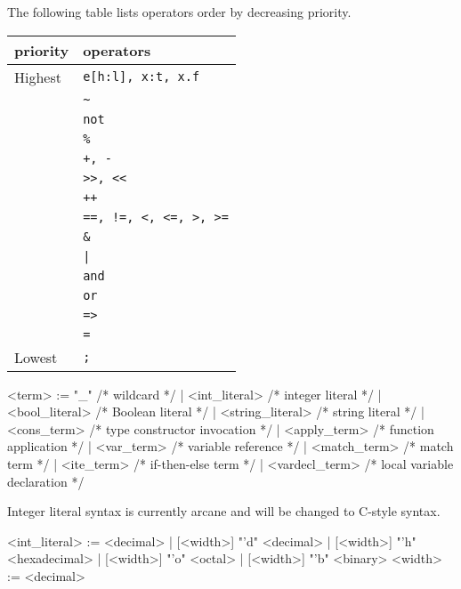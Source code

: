 \documentclass{report}
\newcommand{\src}[1]{\texttt{#1}}
\begin{document}
The following table lists operators order by decreasing priority.

\begin{tabular}{|l|l|}
    \hline
    \textbf{priority} & \textbf{operators} \\
    \hline\hline
    Highest & \src{e[h:l], x:t, x.f} \\
            & \src{\~} \\
            & \src{not} \\
            & \src{\%} \\
            & \src{+, -} \\
            & \src{>>, <<} \\
            & \src{++} \\
            & \src{==, !=, <, <=, >, >=} \\
            & \src{\&} \\
            & \src{|} \\
            & \src{and} \\
            & \src{or} \\
            & \src{=>} \\
            & \src{=} \\
    Lowest  & \src{;} \\
    \hline
\end{tabular}

\begin{bnflisting}{}
<term> := "_"                 /* wildcard */
        | <int_literal>       /* integer literal */
        | <bool_literal>      /* Boolean literal */
        | <string_literal>    /* string literal */
        | <cons_term>         /* type constructor invocation */
        | <apply_term>        /* function application */
        | <var_term>          /* variable reference */
        | <match_term>        /* match term */
        | <ite_term>          /* if-then-else term */
        | <vardecl_term>      /* local variable declaration */
\end{bnflisting}

{\color{red}Integer literal syntax is currently arcane and will be changed to
C-style syntax.}

\begin{bnflisting}{}
<int_literal>  := <decimal>
                | [<width>] "'d" <decimal>
                | [<width>] "'h" <hexadecimal>
                | [<width>] "'o" <octal>
                | [<width>] "'b" <binary>
<width> := <decimal>
\end{bnflisting}
\end{document}
